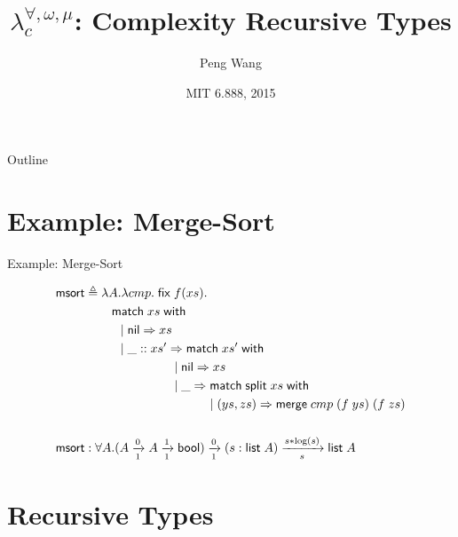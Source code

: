 \documentclass{beamer}
\title
{$\lambda^{\forall,\omega,\mu}_c$: Complexity Recursive Types}
\author
{Peng Wang\inst{1}}
\institute[MIT CSAIL] %
{
  \inst{1}%
  MIT CSAIL
}
\date
{MIT 6.888, 2015}
\newcommand{\arrow}[4]{#1\xrightarrow[#3]{#2}#4}
\newcommand{\symmatch}{\mathsf{match}}
\newcommand{\symwith}{\mathsf{\;with\;}}
\newcommand{\symlist}{\mathsf{list}}
\newcommand{\symnil}{\mathsf{nil}}
\newcommand{\symfix}{\mathsf{fix}}
\newcommand{\symbool}{\mathsf{bool}}
\newcommand{\symmerge}{\mathsf{merge}}
\newcommand{\intro}[2]{(#1 : #2)}
\newcommand{\symmsort}{\mathsf{msort}}
\newcommand{\symsplit}{\mathsf{split}}
\newcommand{\defeq}{\triangleq}
\begin{document}
\begin{frame}
  \titlepage
\end{frame}

\begin{frame}{Outline}
  \tableofcontents
\end{frame}





\section{Example: Merge-Sort}

\begin{frame}{Example: Merge-Sort}

\begin{align*}
\symmsort &\defeq \lambda A. \lambda cmp.\;\symfix\;f(xs). \\
& \hspace{0.3in} \symmatch\;xs\symwith \\
& \hspace{.4in} |\; \symnil\Rightarrow xs \\
& \hspace{.4in} |\; \_::xs' \Rightarrow \symmatch\;xs'\symwith \\
& \hspace{1in} |\; \symnil\Rightarrow xs \\
& \hspace{1in} |\; \_ \Rightarrow \symmatch\; \symsplit\;xs \symwith \\
& \hspace{1.4in} |\; (ys, zs) \Rightarrow \symmerge\;cmp\;(f\;ys)\;(f\;zs) \\
\\
\symmsort &: \forall A.\arrow{(\arrow{A}{0}{1}{\arrow{A}{1}{1}{\symbool}})}{0}{1}{\arrow{\intro{s}{\symlist\;A}}{s*\log(s)}{s}{\symlist\;A}}
\end{align*}

\section{Recursive Types}

\end{frame}
\end{document}
